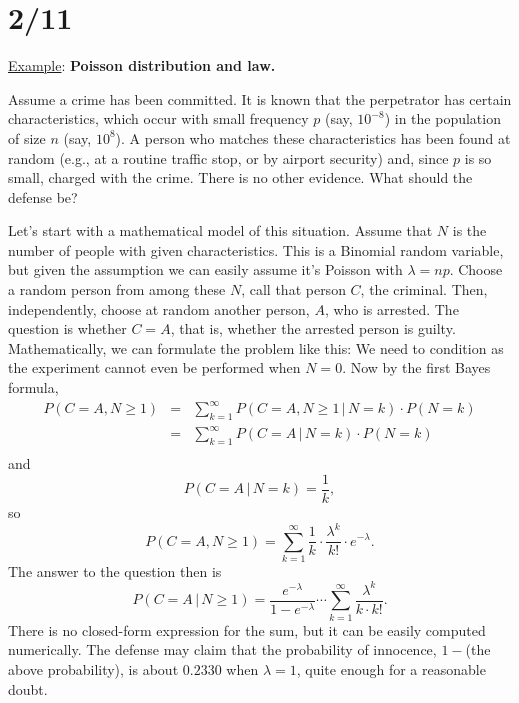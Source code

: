 \section*{2/11}

\underline{Example}: {\bf Poisson distribution and law.} 
\vskip0.2cm 

Assume a crime has been committed. It is known that the 
perpetrator has certain characteristics, which occur
with small frequency $p$ (say, $10^{-8}$) in the population of size $n$
(say, $10^8$). 
A person who matches these characteristics has been 
found at random (e.g., at a routine traffic stop,  or by
airport security) and, since $p$ is so small, charged with the 
crime. There is no other evidence. What should the defense be? 

Let's start with a mathematical model of this situation. Assume 
that $N$ is the number of people with given characteristics. This 
is a Binomial random variable, but given the assumption we can 
easily assume it's Poisson with $\lambda=np$. Choose a random person from 
among these $N$, call that person $C$, the criminal. Then, independently, 
choose at random another person, $A$, who is arrested. The question 
is whether $C=A$, that is, whether the arrested person is guilty. Mathematically, 
we can formulate the problem like this: 
We need to condition as the experiment cannot even be performed when $N=0$. 
Now by the first Bayes formula, 
\begin{eqnarray*}
P(C=A, N\ge 1)&= &\sum_{k=1}^{\infty} P(C=A, N\ge 1\,|\,N=k)\cdot P(N=k)\\
&= &\sum_{k=1}^\infty P(C=A\,|\,N=k)\cdot P(N=k)\\
\end{eqnarray*}
and 
$$
P(C=A\,|\,N=k)=\frac{1}{k}, 
$$
so 
$$
P(C=A, N \ge 1)=\sum_{k=1}^{\infty} \frac{1}{k} \cdot \frac{\lambda^k}{k!}\cdot 
e^{-\lambda}. 
$$
The answer to the question then is 
$$
P(C=A\,|\, N\ge 1)=\frac{e^{-\lambda}}{1-e^{-\lambda}}\cdots
\sum_{k=1}^{\infty} \frac{\lambda^k}{k\cdot k!}. 
$$
There is no closed-form expression for the sum, but it can be easily
computed numerically. The defense may claim 
that the probability of innocence, $1-$(the above probability), 
is about $0.2330$ when $\lambda=1$, quite enough for a reasonable
doubt. 

